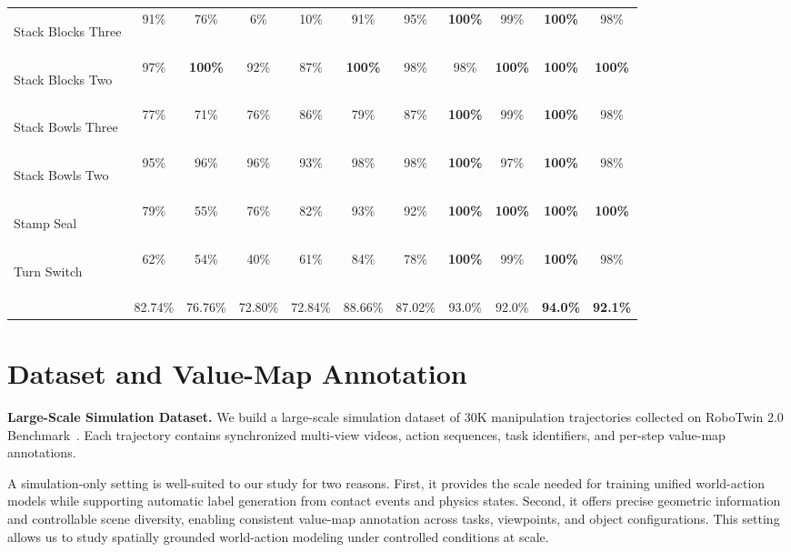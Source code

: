 \documentclass{article}
\newcommand{\bestcell}[1]{\cellcolor{bestlavender}\textbf{#1}}
\begin{document}
\begin{table}[htbp]
\begin{tabular}{>{\itshape\raggedright\arraybackslash}p{3.35cm}cccccccccc}
Stack Blocks Three & 91\% & 76\% & 6\% & 10\% & 91\% & 95\% & \bestcell{100\%} & 99\% & \bestcell{100\%} & 98\% \\
Stack Blocks Two & 97\% & \bestcell{100\%} & 92\% & 87\% & \bestcell{100\%} & 98\% & 98\% & \bestcell{100\%} & \bestcell{100\%} & \bestcell{100\%} \\
Stack Bowls Three & 77\% & 71\% & 76\% & 86\% & 79\% & 87\% & \bestcell{100\%} & 99\% & \bestcell{100\%} & 98\% \\
Stack Bowls Two & 95\% & 96\% & 96\% & 93\% & 98\% & 98\% & \bestcell{100\%} & 97\% & \bestcell{100\%} & 98\% \\
Stamp Seal & 79\% & 55\% & 76\% & 82\% & 93\% & 92\% & \bestcell{100\%} & \bestcell{100\%} & \bestcell{100\%} & \bestcell{100\%} \\
Turn Switch & 62\% & 54\% & 40\% & 61\% & 84\% & 78\% & \bestcell{100\%} & 99\% & \bestcell{100\%} & 98\% \\

\midrule
\multicolumn{1}{l}{\textbf{\upshape Average}}
& 82.74\% & 76.76\%
& 72.80\% & 72.84\%
& 88.66\% & 87.02\%
& 93.0\% & 92.0\%
& \bestcell{94.0\%} & \bestcell{92.1\%} \\
\bottomrule
\end{tabular}
\end{table}


\section{Dataset and Value-Map Annotation}
\label{sec:dataset}

\noindent\textbf{Large-Scale Simulation Dataset.}
We build a large-scale simulation dataset of 30K manipulation trajectories collected on RoboTwin 2.0 Benchmark~\cite{robotwin2.0}. Each trajectory contains synchronized multi-view videos, action sequences, task identifiers, and per-step value-map annotations.

A simulation-only setting is well-suited to our study for two reasons. First, it provides the scale needed for training unified world-action models while supporting automatic label generation from contact events and physics states. Second, it offers precise geometric information and controllable scene diversity, enabling consistent value-map annotation across tasks, viewpoints, and object configurations. This setting allows us to study spatially grounded world-action modeling under controlled conditions at scale.
\end{document}
